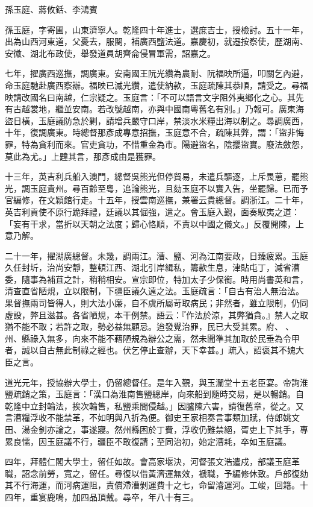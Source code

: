 
\begin{pinyinscope}
孫玉庭、蔣攸銛、李鴻賓

孫玉庭，字寄圃，山東濟寧人。乾隆四十年進士，選庶吉士，授檢討。五十一年，出為山西河東道，父憂去，服闋，補廣西鹽法道。嘉慶初，就遷按察使，歷湖南、安徽、湖北布政使，舉發道員胡齊侖侵冒軍需，詔嘉之。

七年，擢廣西巡撫，調廣東。安南國王阮光纘為農耐、阮福映所逼，叩關乞內避，命玉庭馳赴廣西察辦。福映已滅光纘，遣使納款，玉庭疏陳其恭順，請受之。尋福映請改國名曰南越，仁宗疑之。玉庭言：「不可以語言文字阻外夷鄉化之心。其先有古越裳地，繼並安南。若改號越南，亦與中國南粵舊名有別。」乃報可。廣東海盜日橫，玉庭議防急於剿，請增兵嚴守口岸，禁淡水米糧出海以制之。尋調廣西，十年，復調廣東。時總督那彥成專意招撫，玉庭意不合，疏陳其弊，謂：「盜非悔罪，特為貪利而來。官吏貪功，不惜重金為市。陽避盜名，陰攖盜實。廢法斂怨，莫此為尤。」上韙其言，那彥成由是獲罪。

十三年，英吉利兵船入澳門，總督吳熊光但停貿易，未遣兵驅逐，上斥畏葸，罷熊光，調玉庭貴州。尋百齡至粵，追論熊光，且劾玉庭不以實入告，坐罷歸。已而予官編修，在文穎館行走。十五年，授雲南巡撫，兼署云貴總督。調浙江。二十年，英吉利貢使不原行跪拜禮，廷議以其倔強，遣之。會玉庭入覲，面奏馭夷之道：「妄有干求，當折以天朝之法度；歸心恪順，不責以中國之儀文。」反覆開陳，上意乃解。

二十一年，擢湖廣總督。未幾，調兩江。漕、鹽、河為江南要政，日臻疲累。玉庭久任封圻，治尚安靜，整頓江西、湖北引岸緝私，籌款生息，津貼屯丁，減省漕委，隨事為補苴之計，稍稍相安。宣宗即位，特加太子少保銜。時用尚書英和言，清查直省陋規，立以限制，下疆臣議久遠之法。玉庭疏言：「自古有治人無治法。果督撫兩司皆得人，則大法小廉，自不虞所屬苛取病民；非然者，雖立限制，仍同虛設，弊且滋甚。各省陋規，本干例禁。語云：『作法於涼，其弊猶貪。』禁人之取猶不能不取；若許之取，勢必益無顧忌。迨發覺治罪，民已大受其累。府、、州、縣祿入無多，向來不能不藉陋規為辦公之需，然未聞準其加取於民垂為令甲者，誠以自古無此制祿之經也。伏乞停止查辦，天下幸甚。」疏入，詔褒其不媿大臣之言。

道光元年，授協辦大學士，仍留總督任。是年入覲，與玉瀾堂十五老臣宴。帝詢淮鹽疏銷之策，玉庭言：「漢口為淮南售鹽總岸，向來船到隨時交易，是以暢銷。自乾隆中立封輪法，挨次輪售，私鹽乘間侵越。」因臚陳六害，請復舊章，從之。又言漕糧浮收不能禁革，不如明與八折為便。御史王家相奏言事類加賦，侍郎姚文田、湯金釗亦論之，事遂寢。然州縣困於丁費，浮收仍難禁絕，胥吏上下其手，專累良懦，因玉庭議不行，疆臣不敢復請；至同治初，始定漕耗，卒如玉庭議。

四年，拜體仁閣大學士，留任如故。會高家堰決，河督張文浩遣戍，部議玉庭革職，詔念前勞，寬之，留任。尋復以借黃濟運無效，褫職，予編修休致。戶部復劾其不行海運，而河病運阻，責償滯漕剝運費十之七，命留濬運河。工竣，回籍。十四年，重宴鹿鳴，加四品頂戴。尋卒，年八十有三。


\end{pinyinscope}

